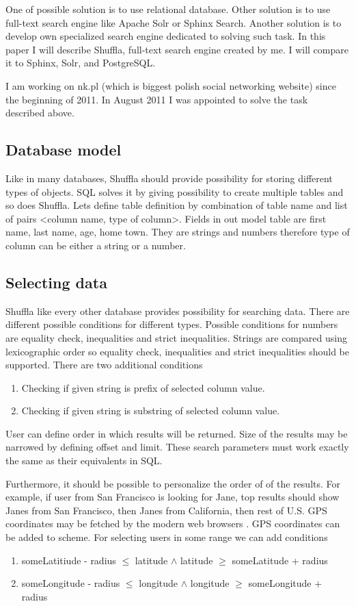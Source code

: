 \documentclass[10pt,a4paper]{article}
\begin{document}
One of possible solution is to use relational database. Other solution is to use full-text search engine like Apache Solr or Sphinx Search. Another solution is to develop own specialized search engine dedicated to solving such task. In this paper I will describe Shuffla, full-text search engine created by me. I will compare it to Sphinx, Solr, and PostgreSQL. 

I am working on nk.pl (which is biggest polish social networking website) since the beginning of 2011. In August 2011 I was appointed to solve the task described above. 

\subsection{Database model}

Like in many databases, Shuffla should provide possibility for storing different types of objects. SQL solves it by giving possibility to create multiple tables and so does Shuffla. Lets define table definition by combination of table name and list of pairs <column name, type of column>. Fields in out model table are first name, last name, age, home town. They are strings and numbers therefore type of column can be either a string or a number.

\subsection{Selecting data}
Shuffla like every other database provides possibility for searching data. There are different possible conditions for different types. Possible conditions for numbers are equality check, inequalities and strict inequalities. Strings are compared using lexicographic order so equality check, inequalities and strict inequalities should be supported. There are two additional conditions
\begin{enumerate}
\item Checking if given string is prefix of selected column value.
\item Checking if given string is substring of selected column value. 
\end{enumerate}

User can define order in which results will be returned. Size of the results may be narrowed by defining offset and limit. These search parameters must work exactly the same as their equivalents in SQL.

Furthermore, it should be possible to personalize the order of of the results. For example, if user from San Francisco is looking for Jane, top results should show Janes from San Francisco, then Janes from California, then rest of U.S. GPS coordinates may be fetched by the modern web browsers \cite{FETCHGPS}. GPS coordinates can be added to scheme. For selecting users in some range we can add conditions   
\begin{enumerate}
\item{someLatitiude - radius $\leq$ latitude $\wedge$ latitude $\geq$ someLatitude + radius}
\item{someLongitude - radius $\leq$ longitude $\wedge$ longitude $\geq$ someLongitude + radius}
\end{enumerate}
\end{document}
